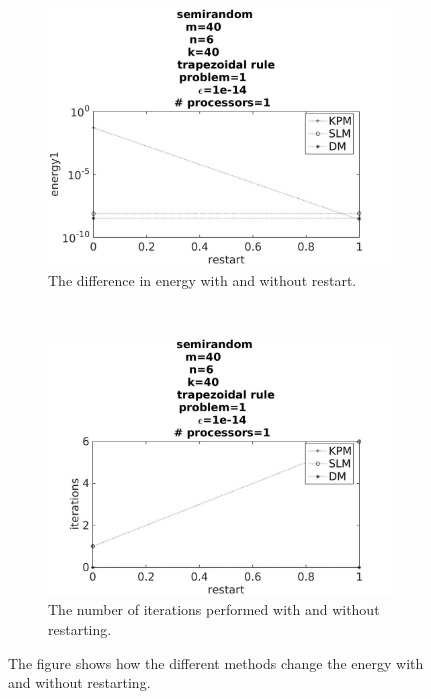 \begin{figure}[H]
        \centering
        \begin{subfigure}[b]{0.45\textwidth}
                \includegraphics[width=\textwidth]{../MATLAB/fig/compareEnergy.jpg}
                \caption{ The difference in energy with and without restart. }
                \label{fig:compareEnergy}
        \end{subfigure}
        ~
        \begin{subfigure}[b]{0.45\textwidth}
                \includegraphics[width=\textwidth]{../MATLAB/fig/compareIter.jpg}
                \caption{ The number of iterations performed with and without restarting.  }
                \label{fig:compareIter}
        \end{subfigure}
        \caption{ The figure shows how the different methods change the energy with and without restarting.  }
        \label{fig:compare}
\end{figure}

